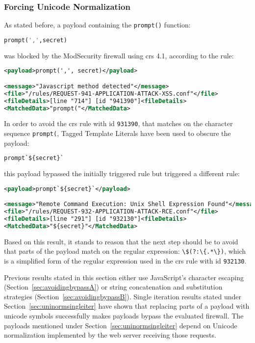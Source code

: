 \subsubsection{Forcing Unicode Normalization}

\label{sec:forcedunicodenorm}
As stated before, a payload containing the \verb|prompt()| function:

\begin{lstlisting}[style=basicStyle, escapeinside=\^\^, language=Python]
prompt(',',secret)
\end{lstlisting}
was blocked by the ModSecurity firewall using \acrshort{crs} 4.1, according to the rule:

\begin{lstlisting}[style=ruleStyle, language=XML]
<payload>prompt(',', secret)</payload>

<message>"Javascript method detected"</message>
<file>"/rules/REQUEST-941-APPLICATION-ATTACK-XSS.conf"</file>
<fileDetails>[line "714"] [id "941390"]<fileDetails>
<MatchedData>"prompt("</MatchedData>
\end{lstlisting}
In order to avoid the \acrshort{crs} rule with id \verb|931390|, that matches on the character sequence \verb|prompt(|, Tagged Template Literals have been used to obscure the payload:

\begin{lstlisting}[style=basicStyle, escapeinside=\^\^, language=Python]
prompt`${secret}`
\end{lstlisting}
this payload bypassed the initially triggered rule but triggered a different rule:

\begin{lstlisting}[style=ruleStyle, language=XML]
<payload>prompt`${secret}`</payload>

<message>"Remote Command Execution: Unix Shell Expression Found"</message>
<file>"/rules/REQUEST-932-APPLICATION-ATTACK-RCE.conf"</file>
<fileDetails>[line "291"] [id "932130"]<fileDetails>
<MatchedData>"${secret}"</MatchedData>
\end{lstlisting}
Based on this result, it stands to reason that the next step should be to avoid that parts of the payload match on the regular expression: \verb|\$(?:\{.*\})|, which is a simplified form of the regular expression used in the \acrshort{crs} rule with id \verb|932130|.

Previous results stated in this section either use JavaScript's character escaping (Section~\ref{sec:avoidingbypassA}) or string concatenation and substitution strategies (Section~\ref{sec:avoidingbypassB}). Single iteration results stated under Section~\ref{sec:uninormsingleiter} have shown that replacing parts of a payload with unicode symbols successfully makes payloads bypass the evaluated firewall. The payloads mentioned under Section~\ref{sec:uninormsingleiter} depend on Unicode normalization implemented by the web server receiving those requests.

